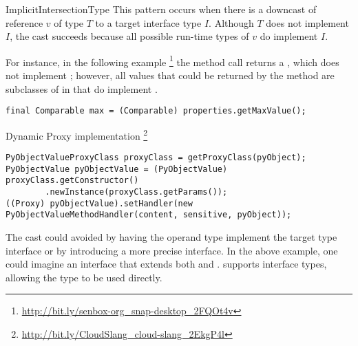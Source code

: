 \begin{pattern}{ImplicitIntersectionType}
This pattern occurs when there is a downcast of reference $v$ of type $T$ to a
target
interface type $I$.
Although $T$ does not implement $I$, 
the cast succeeds because all possible run-time types of $v$
do implement $I$.

\instances{}
For instance, in the following example%
\footnote{\url{http://bit.ly/senbox-org_snap-desktop_2FQOt4v}}
the method call returns a , which does not implement
; however,
all values that could be returned by the method
are subclasses of  in 
that do implement .

\begin{verbatim}
final Comparable max = (Comparable) properties.getMaxValue();
\end{verbatim}

Dynamic Proxy implementation
\footnote{\url{http://bit.ly/CloudSlang_cloud-slang_2EkgP4l}}

\begin{verbatim}
PyObjectValueProxyClass proxyClass = getProxyClass(pyObject);
PyObjectValue pyObjectValue = (PyObjectValue) proxyClass.getConstructor()
        .newInstance(proxyClass.getParams());
((Proxy) pyObjectValue).setHandler(new PyObjectValueMethodHandler(content, sensitive, pyObject));
\end{verbatim}

\discussion{}
The cast could avoided by having the operand type implement the target type
  interface or by introducing a more precise interface.
  In the above example, one could imagine an interface
   that extends both  and
  . \scala{} supports
  interface types, allowing 
  the type 
  to be used directly.

\end{pattern}